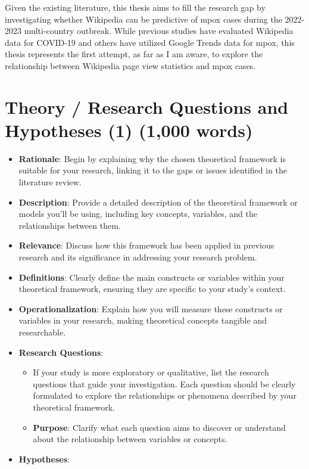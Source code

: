 \documentclass[
  12pt,
]{article}
\begin{document}
Given the existing literature, this thesis aims to fill the research gap
by investigating whether Wikipedia can be predictive of mpox cases
during the 2022-2023 multi-country outbreak. While previous studies have
evaluated Wikipedia data for COVID-19 and others have utilized Google
Trends data for mpox, this thesis represents the first attempt, as far
as I am aware, to explore the relationship between Wikipedia page view
statistics and mpox cases.

\section{Theory / Research Questions and Hypotheses (1) (1,000
words)}\label{theory-research-questions-and-hypotheses-1-1000-words}

\begin{itemize}
\item
  \textbf{Rationale}: Begin by explaining why the chosen theoretical
  framework is suitable for your research, linking it to the gaps or
  issues identified in the literature review.
\item
  \textbf{Description}: Provide a detailed description of the
  theoretical framework or models you'll be using, including key
  concepts, variables, and the relationships between them.
\item
  \textbf{Relevance}: Discuss how this framework has been applied in
  previous research and its significance in addressing your research
  problem.
\item
  \textbf{Definitions}: Clearly define the main constructs or variables
  within your theoretical framework, ensuring they are specific to your
  study's context.
\item
  \textbf{Operationalization}: Explain how you will measure these
  constructs or variables in your research, making theoretical concepts
  tangible and researchable.
\item
  \textbf{Research Questions}:

  \begin{itemize}
  \item
    If your study is more exploratory or qualitative, list the research
    questions that guide your investigation. Each question should be
    clearly formulated to explore the relationships or phenomena
    described by your theoretical framework.
  \item
    \textbf{Purpose}: Clarify what each question aims to discover or
    understand about the relationship between variables or concepts.
  \end{itemize}
\item
  \textbf{Hypotheses}:


\end{itemize}
\end{document}
